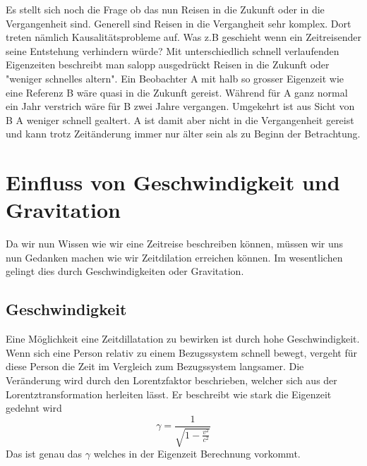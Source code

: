 \begin{refsection}
Es stellt sich noch die Frage ob das nun Reisen in die Zukunft oder in die Vergangenheit sind. Generell sind Reisen in die Vergangheit sehr komplex. Dort treten nämlich Kausalitätsprobleme auf. Was z.B geschieht wenn ein Zeitreisender seine Entstehung verhindern würde?
Mit unterschiedlich schnell verlaufenden Eigenzeiten beschreibt man salopp ausgedrückt Reisen in die Zukunft oder "weniger schnelles altern". Ein Beobachter A mit halb so grosser Eigenzeit wie eine Referenz B wäre quasi in die Zukunft gereist. Während für A ganz normal ein Jahr verstrich wäre für B zwei Jahre vergangen. Umgekehrt ist aus Sicht von B A weniger schnell gealtert. A ist damit aber nicht in die Vergangenheit gereist und kann trotz Zeit\"anderung immer nur älter sein als zu Beginn der Betrachtung.
\section{Einfluss von Geschwindigkeit und Gravitation}
Da wir nun Wissen wie wir eine Zeitreise beschreiben können, müssen wir uns nun Gedanken machen wie wir Zeitdilation erreichen können. Im wesentlichen gelingt dies durch Geschwindigkeiten oder Gravitation. 
\subsection{Geschwindigkeit}
Eine M\"oglichkeit eine Zeitdillatation zu bewirken ist durch hohe Geschwindigkeit. Wenn sich eine Person relativ zu einem Bezugssystem schnell bewegt, vergeht f\"ur diese Person die Zeit im Vergleich zum Bezugssystem langsamer. Die Ver\"anderung wird durch den Lorentzfaktor beschrieben, welcher sich aus der Lorentztransformation herleiten l\"asst. Er beschreibt wie stark  die Eigenzeit gedehnt wird %
\begin{equation}
    \gamma=\frac{1}{\sqrt{1-\displaystyle\frac{v^2}{c^2}}} 
\end{equation}
Das ist genau das $\gamma$ welches in der Eigenzeit Berechnung vorkommt.


\end{refsection}
